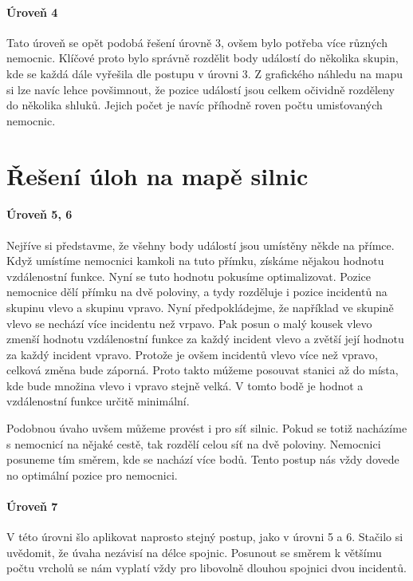 \documentclass[12pt,a4paper]{article}
\begin{document}
\paragraph*{Úroveň 4}
Tato úroveň se opět podobá řešení úrovně 3, ovšem bylo potřeba více různých nemocnic. Klíčové proto bylo správně rozdělit body událostí do několika skupin, kde se každá dále vyřešila dle postupu v úrovni 3.
Z grafického náhledu na mapu si lze navíc lehce povšimnout, že pozice událostí jsou celkem očividně rozděleny do několika shluků. Jejich počet je navíc příhodně roven počtu umisťovaných nemocnic.

\section*{Řešení úloh na mapě silnic}
\paragraph*{Úroveň 5, 6}
Nejříve si představme, že všehny body událostí jsou umístěny někde na přímce. Když umístíme nemocnici kamkoli na tuto přímku, získáme nějakou hodnotu vzdálenostní funkce.
Nyní se tuto hodnotu pokusíme optimalizovat. Pozice nemocnice dělí přímku na dvě poloviny, a tydy rozděluje i pozice incidentů na skupinu vlevo a skupinu vpravo.
Nyní předpokládejme, že například ve skupině vlevo se nechází více incidentu než vrpavo. Pak posun o malý kousek vlevo zmenší hodnotu vzdálenostní funkce za každý incident vlevo a zvětší její hodnotu za každý incident vpravo.
Protože je ovšem incidentů vlevo více než vpravo, celková změna bude záporná. Proto takto múžeme posouvat stanici až do místa, kde bude množina vlevo i vpravo stejně velká.
V tomto bodě je hodnot a vzdálenostní funkce určitě minimální.

Podobnou úvaho uvšem můžeme provést i pro síť silnic. Pokud se totiž nacházíme s nemocnicí na nějaké cestě, tak rozdělí celou síť na dvě poloviny. Nemocnici posuneme tím směrem, kde se nachází více bodů.
Tento postup nás vždy dovede no optimální pozice pro nemocnici.

\paragraph*{Úroveň 7}
V této úrovni šlo aplikovat naprosto stejný postup, jako v úrovni 5 a 6. Stačilo si uvědomit, že úvaha nezávisí na délce spojnic. Posunout se směrem k většímu počtu vrcholů se nám vyplatí vždy pro libovolně dlouhou spojnici dvou incidentů.
\end{document}
